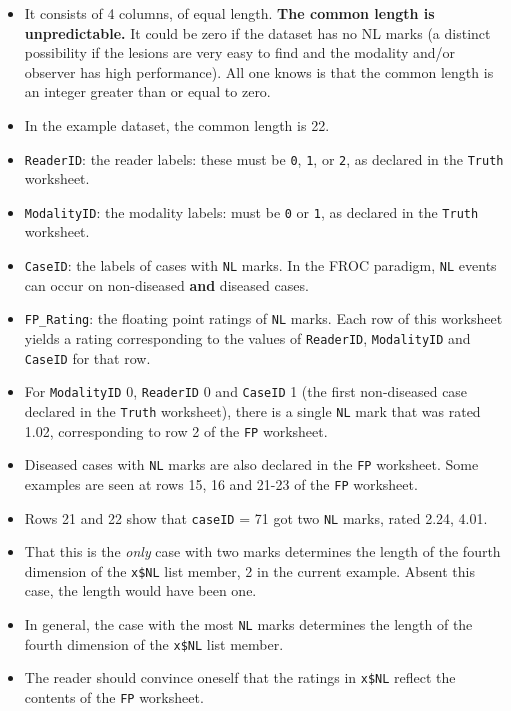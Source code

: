 \documentclass[
]{book}
\providecommand{\tightlist}{%
  \setlength{\itemsep}{0pt}\setlength{\parskip}{0pt}}
\begin{document}
\begin{itemize}
\tightlist
\item
  It consists of 4 columns, of equal length. \textbf{The common length is unpredictable.} It could be zero if the dataset has no NL marks (a distinct possibility if the lesions are very easy to find and the modality and/or observer has high performance). All one knows is that the common length is an integer greater than or equal to zero.
\item
  In the example dataset, the common length is 22.
\item
  \texttt{ReaderID}: the reader labels: these must be \texttt{0}, \texttt{1}, or \texttt{2}, as declared in the \texttt{Truth} worksheet.
\item
  \texttt{ModalityID}: the modality labels: must be \texttt{0} or \texttt{1}, as declared in the \texttt{Truth} worksheet.
\item
  \texttt{CaseID}: the labels of cases with \texttt{NL} marks. In the FROC paradigm, \texttt{NL} events can occur on non-diseased \textbf{and} diseased cases.
\item
  \texttt{FP\_Rating}: the floating point ratings of \texttt{NL} marks. Each row of this worksheet yields a rating corresponding to the values of \texttt{ReaderID}, \texttt{ModalityID} and \texttt{CaseID} for that row.
\item
  For \texttt{ModalityID} 0, \texttt{ReaderID} 0 and \texttt{CaseID} 1 (the first non-diseased case declared in the \texttt{Truth} worksheet), there is a single \texttt{NL} mark that was rated 1.02, corresponding to row 2 of the \texttt{FP} worksheet.
\item
  Diseased cases with \texttt{NL} marks are also declared in the \texttt{FP} worksheet. Some examples are seen at rows 15, 16 and 21-23 of the \texttt{FP} worksheet.
\item
  Rows 21 and 22 show that \texttt{caseID} = 71 got two \texttt{NL} marks, rated 2.24, 4.01.
\item
  That this is the \emph{only} case with two marks determines the length of the fourth dimension of the \texttt{x\$NL} list member, 2 in the current example. Absent this case, the length would have been one.
\item
  In general, the case with the most \texttt{NL} marks determines the length of the fourth dimension of the \texttt{x\$NL} list member.
\item
  The reader should convince oneself that the ratings in \texttt{x\$NL} reflect the contents of the \texttt{FP} worksheet.
\end{itemize}
\end{document}
